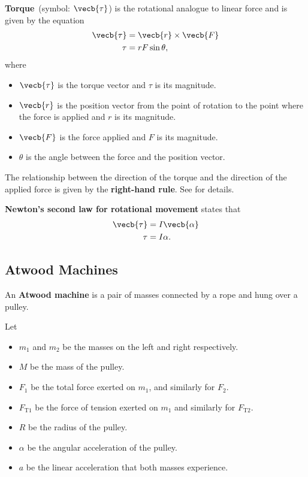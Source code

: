 \textbf{Torque}~(symbol: \(\vecb{\tau}\)) is the rotational analogue
to linear force
and is given by the equation
\begin{equation}
    \begin{aligned}
        \vecb{\tau} &= \vecb{r} \times \vecb{F} \\
        \tau &= r F \sin\theta,
    \end{aligned}
\end{equation}
where
\begin{itemize}
    \item \(\vecb{\tau}\) is the torque vector and \(\tau\) is its magnitude.
    \item \(\vecb{r}\) is the position vector from the point of rotation
        to the point where the force is applied
        and \(r\) is its magnitude.
    \item \(\vecb{F}\) is the force applied and \(F\) is its magnitude.
    \item \(\theta\) is the angle between the force and the position vector.
\end{itemize}

The relationship between the direction of the torque
and the direction of the applied force is given by the \textbf{right-hand rule}.
See  for details.

\textbf{Newton's second law for rotational movement} states that
\begin{equation} \label{eq:newtons-2nd-law-rotational}
    \begin{aligned}
        \vecb{\tau} &= I \vecb{\alpha} \\
        \tau &= I \alpha.
    \end{aligned}
\end{equation}

\subsection{Atwood Machines}

An \textbf{Atwood machine} is a pair of masses connected by a rope
and hung over a pulley.

Let
\begin{itemize}
    \item \(m_1\) and \(m_2\) be
        the masses on the left and right respectively.
    \item \(M\) be the mass of the pulley.
    \item \(F_1\) be the total force exerted on \(m_1\),
        and similarly for \(F_2\).
    \item \(F_\mathrm{T1}\) be the force of tension exerted on \(m_1\)
        and similarly for \(F_\mathrm{T2}\).
    \item \(R\) be the radius of the pulley.
    \item \(\alpha\) be the angular acceleration of the pulley.
    \item \(a\) be the linear acceleration that both masses experience.
\end{itemize}

